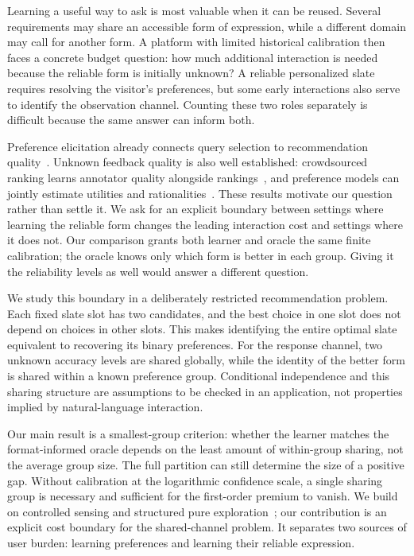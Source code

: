 \documentclass[sigconf,anonymous,review]{acmart}
\begin{document}
Learning a useful way to ask is most valuable when it can be reused. Several requirements may share an accessible form of expression, while a different domain may call for another form. A platform with limited historical calibration then faces a concrete budget question: how much additional interaction is needed because the reliable form is initially unknown? A reliable personalized slate requires resolving the visitor's preferences, but some early interactions also serve to identify the observation channel. Counting these two roles separately is difficult because the same answer can inform both.

Preference elicitation already connects query selection to recommendation quality~\cite{guo2010}. Unknown feedback quality is also well established: crowdsourced ranking learns annotator quality alongside rankings~\cite{chen2013}, and preference models can jointly estimate utilities and rationalities~\cite{yamagata2024}. These results motivate our question rather than settle it. We ask for an explicit boundary between settings where learning the reliable form changes the leading interaction cost and settings where it does not. Our comparison grants both learner and oracle the same finite calibration; the oracle knows only which form is better in each group. Giving it the reliability levels as well would answer a different question.

We study this boundary in a deliberately restricted recommendation problem. Each fixed slate slot has two candidates, and the best choice in one slot does not depend on choices in other slots. This makes identifying the entire optimal slate equivalent to recovering its binary preferences. For the response channel, two unknown accuracy levels are shared globally, while the identity of the better form is shared within a known preference group. Conditional independence and this sharing structure are assumptions to be checked in an application, not properties implied by natural-language interaction.

Our main result is a smallest-group criterion: whether the learner matches the format-informed oracle depends on the least amount of within-group sharing, not the average group size. The full partition can still determine the size of a positive gap. Without calibration at the logarithmic confidence scale, a single sharing group is necessary and sufficient for the first-order premium to vanish. We build on controlled sensing and structured pure exploration~\cite{deshmukh2019,degenne2019,garivier2016}; our contribution is an explicit cost boundary for the shared-channel problem. It separates two sources of user burden: learning preferences and learning their reliable expression.
\end{document}
